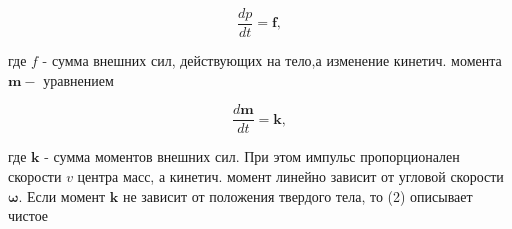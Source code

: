 \documentclass[10pt]{article}
\begin{document}
\[

\frac{d p}{d t}=\boldsymbol{f},

\]



где $f$ - сумма внешних сил, действующих на тело,а изменение кинетич. момента $\boldsymbol{m}-$ уравнением



\[

\frac{d \boldsymbol{m}}{d t}=\boldsymbol{k},

\]



где $\boldsymbol{k}$ - сумма моментов внешних сил. При этом импульс пропорционален скорости $v$ центра масс, а кинетич. момент линейно зависит от угловой скорости $\boldsymbol{\omega}$. Если момент $\boldsymbol{k}$ не зависит от положения твердого тела, то (2) описывает чистое
\end{document}
